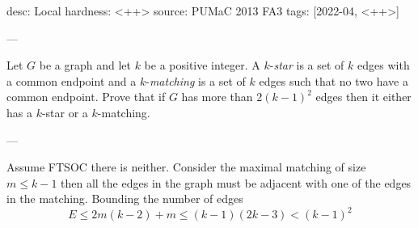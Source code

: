 desc: Local
hardness: <++>
source: PUMaC 2013 FA3
tags: [2022-04, <++>]

---

Let $G$ be a graph and let $k$ be a positive integer.
A $k$-\emph{star} is a set of $k$ edges with a common endpoint
and a $k$-\emph{matching} is a set of $k$ edges such that
no two have a common endpoint.
Prove that if $G$ has more than $2(k-1)^2$ edges then
it either has a $k$-star or a $k$-matching.

---

Assume FTSOC there is neither. Consider the maximal matching of size $m \leq k-1$ 
then all the edges in the graph must be adjacent with 
one of the edges in the matching. Bounding the number of edges
\[E \leq 2m(k-2) + m \leq (k-1)(2k-3) < (k-1)^2 \]
